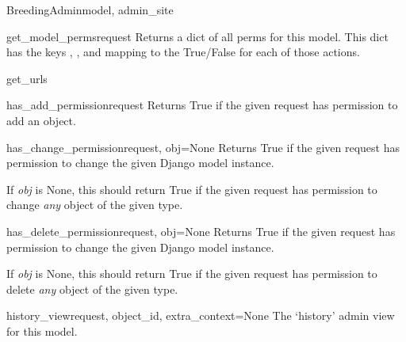 \documentclass[letterpaper,10pt,english]{sphinxmanual}
\begin{document}
\begin{classdesc}{BreedingAdmin}{model, admin\_site}
\hypertarget{animal.admin.BreedingAdmin.get_model_perms}{}\begin{methoddesc}{get\_model\_perms}{request}
Returns a dict of all perms for this model. This dict has the keys
, , and  mapping to the True/False for each
of those actions.
\end{methoddesc}

\hypertarget{animal.admin.BreedingAdmin.get_urls}{}\begin{methoddesc}{get\_urls}{}\end{methoddesc}

\hypertarget{animal.admin.BreedingAdmin.has_add_permission}{}\begin{methoddesc}{has\_add\_permission}{request}
Returns True if the given request has permission to add an object.
\end{methoddesc}

\hypertarget{animal.admin.BreedingAdmin.has_change_permission}{}\begin{methoddesc}{has\_change\_permission}{request, obj=None}
Returns True if the given request has permission to change the given
Django model instance.

If \emph{obj} is None, this should return True if the given request has
permission to change \emph{any} object of the given type.
\end{methoddesc}

\hypertarget{animal.admin.BreedingAdmin.has_delete_permission}{}\begin{methoddesc}{has\_delete\_permission}{request, obj=None}
Returns True if the given request has permission to change the given
Django model instance.

If \emph{obj} is None, this should return True if the given request has
permission to delete \emph{any} object of the given type.
\end{methoddesc}

\hypertarget{animal.admin.BreedingAdmin.history_view}{}\begin{methoddesc}{history\_view}{request, object\_id, extra\_context=None}
The `history' admin view for this model.
\end{methoddesc}


\end{classdesc}
\end{document}
